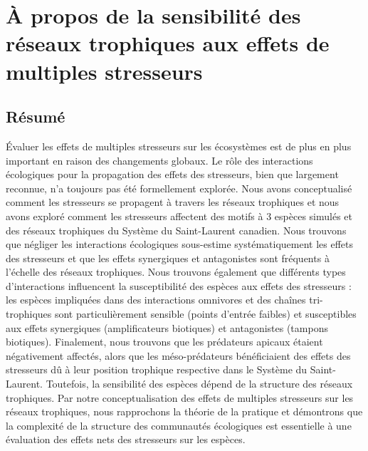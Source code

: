 \chapter{À propos de la sensibilité des réseaux trophiques aux effets de multiples stresseurs}
\label{chap1}

\section{Résumé}

Évaluer les effets de multiples stresseurs sur les écosystèmes est de plus en plus important en raison des changements globaux. Le rôle des interactions écologiques pour la propagation des effets des stresseurs, bien que largement reconnue, n’a toujours pas été formellement explorée. Nous avons conceptualisé comment les stresseurs se propagent à travers les réseaux trophiques et nous avons exploré comment les stresseurs affectent des motifs à 3 espèces simulés et des réseaux trophiques du Système du Saint-Laurent canadien. Nous trouvons que négliger les interactions écologiques sous-estime systématiquement les effets des stresseurs et que les effets synergiques et antagonistes sont fréquents à l’échelle des réseaux trophiques. Nous trouvons également que différents types d’interactions influencent la susceptibilité des espèces aux effets des stresseurs : les espèces impliquées dans des interactions omnivores et des chaînes tri-trophiques sont particulièrement sensible (points d’entrée faibles) et susceptibles aux effets synergiques (amplificateurs biotiques) et antagonistes (tampons biotiques). Finalement, nous trouvons que les prédateurs apicaux étaient négativement affectés, alors que les méso-prédateurs bénéficiaient des effets des stresseurs dû à leur position trophique respective dans le Système du Saint-Laurent. Toutefois, la sensibilité des espèces dépend de la structure des réseaux trophiques. Par notre conceptualisation des effets de multiples stresseurs sur les réseaux trophiques, nous rapprochons la théorie de la pratique et démontrons que la complexité de la structure des communautés écologiques est essentielle à une évaluation des effets nets des stresseurs sur les espèces.

